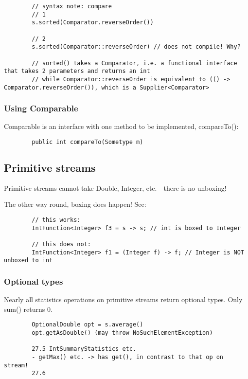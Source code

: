 \documentclass{scrartcl}
\begin{document}
    \begin{lstlisting}
        // syntax note: compare
        // 1
        s.sorted(Comparator.reverseOrder())

        // 2
        s.sorted(Comparator::reverseOrder) // does not compile! Why?

        // sorted() takes a Comparator, i.e. a functional interface that takes 2 parameters and returns an int
        // while Comparator::reverseOrder is equivalent to (() -> Comparator.reverseOrder()), which is a Supplier<Comparator>
    \end{lstlisting}

\subsubsection{Using Comparable}

    Comparable is an interface with one method to be implemented, compareTo():

    \begin{lstlisting}
        public int compareTo(Sometype m)
    \end{lstlisting}

\subsection{Primitive streams}

    Primitive streams cannot take Double, Integer, etc. - there is no unboxing!

    The other way round, boxing does happen! See:

    \begin{lstlisting}
        // this works:
        IntFunction<Integer> f3 = s -> s; // int is boxed to Integer

        // this does not:
        IntFunction<Integer> f1 = (Integer f) -> f; // Integer is NOT unboxed to int
    \end{lstlisting}

\subsubsection{Optional types}

    Nearly all statistics operations on primitive streams return optional types.
    Only sum() returns 0.

    \begin{lstlisting}
        OptionalDouble opt = s.average()
        opt.getAsDouble() (may throw NoSuchElementException)

        27.5 IntSummaryStatistics etc.
        - getMax() etc. -> has get(), in contrast to that op on stream!
        27.6
    \end{lstlisting}
\end{document}
